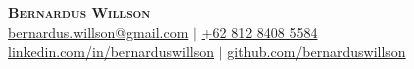 \begingroup
\setlength{\topsep}{0pt}
\setlength{\partopsep}{0pt}
\begin{center}
    \textbf{\Huge \scshape Bernardus Willson} \\[2pt]
    \small
    \href{mailto:bernardus.willson@gmail.com}{bernardus.willson@gmail.com} $|$
    \href{tel:+6281284085584}{+62 812 8408 5584} \\
    \href{https://linkedin.com/in/bernarduswillson}{linkedin.com/in/bernarduswillson} $|$
    \href{https://github.com/bernarduswillson}{github.com/bernarduswillson}
\end{center}
\endgroup
